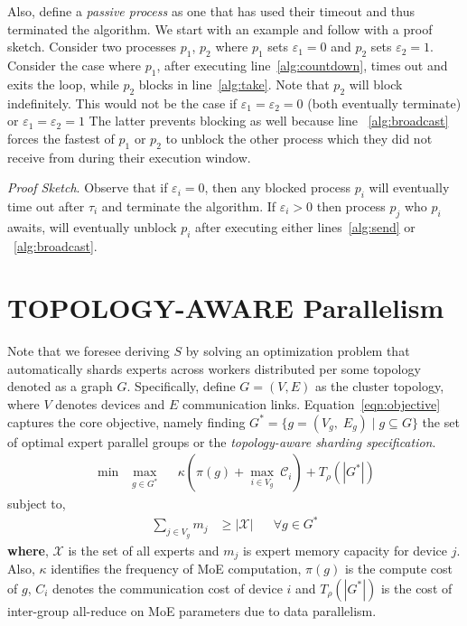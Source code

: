 Also, define a \emph{passive process} as one that has used their timeout and thus terminated the algorithm.
We start with an example and follow with a proof sketch.
Consider two processes $p_1$, $p_2$ where $p_1$ sets $\varepsilon_1=0$ and $p_2$ sets $\varepsilon_2=1$.
Consider the case where $p_1$, after executing line~\ref{alg:countdown},
times out and exits the loop, while $p_2$ blocks in line~\ref{alg:take}.
Note that $p_2$ will block indefinitely.
This would not be the case if $\varepsilon_1=\varepsilon_2=0$
(both eventually terminate) or $\varepsilon_1=\varepsilon_2=1$
The latter prevents blocking as well
because line ~\ref{alg:broadcast} forces the fastest of $p_1$ or $p_2$ to unblock the other process
which they did not receive from during their execution window.

\noindent\emph{Proof Sketch}.
Observe that if $\varepsilon_i =0$,
then any blocked process $p_i$ will eventually time out after $\tau_i$ and terminate the algorithm.
If $\varepsilon_i > 0$ then process $p_j$ who $p_i$ awaits, will eventually unblock $p_i$ after executing
either lines~\ref{alg:send} or ~\ref{alg:broadcast}.

\section{TOPOLOGY-AWARE Parallelism}\label{sec:automatic-parallelism}
Note that we foresee deriving $S$ by solving an optimization problem that automatically shards experts across
workers distributed per some topology denoted as a graph $G$.
Specifically, define $G = (V, E)$ as the cluster topology, where $V$ denotes devices and
$E$ communication links.
Equation~\ref{eqn:objective} captures the core objective, namely finding
$G^* = \{g=(V_g,\;E_g)\;|\; g \subseteq G\}$ the set of optimal expert parallel groups or the
\emph{topology-aware sharding specification}.
\begin{align}\label{eqn:objective}
\min \enspace \max_{g \in G^*} \enspace
& \kappa\left( \pi(g) + \max_{i \in V_g} \> \mathcal{C}_i \right) +
T_{\rho}(|G^*|)
\end{align}
subject to,
\begin{align}\label{eqn:constraint}
\sum\limits_{j \in V_g}{m_j} &\geq |\mathcal{X}| &&\forall g \in G^*
\end{align}
\textbf{where}, $\mathcal{X}$ is the set of all experts and $m_j$ is expert memory capacity for device $j$.
Also, $\kappa$ identifies the frequency of MoE computation,
$\pi(g)$ is the compute cost of $g$, ${C}_i$ denotes the communication cost of device $i$ and
$T_{\rho}(|G^*|)$ is the cost of inter-group all-reduce on MoE parameters due to data parallelism.